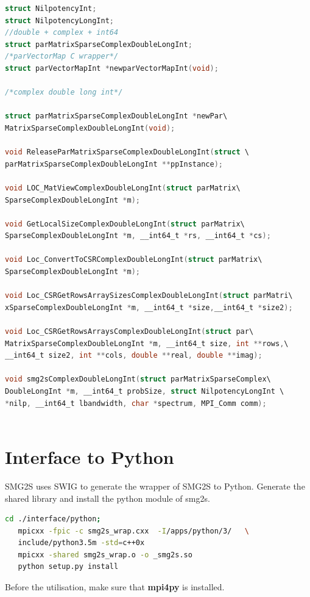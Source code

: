 \documentclass[a4paper, 10 pt]{report}
\begin{document}
	\begin{lstlisting}[language=C,frame=single,	basicstyle=\footnotesize]
struct NilpotencyInt;
struct NilpotencyLongInt;
//double + complex + int64
struct parMatrixSparseComplexDoubleLongInt;   
/*parVectorMap C wrapper*/
struct parVectorMapInt *newparVectorMapInt(void);
   
/*complex double long int*/
   
struct parMatrixSparseComplexDoubleLongInt *newPar\
MatrixSparseComplexDoubleLongInt(void);

void ReleaseParMatrixSparseComplexDoubleLongInt(struct \
parMatrixSparseComplexDoubleLongInt **ppInstance);

void LOC_MatViewComplexDoubleLongInt(struct parMatrix\
SparseComplexDoubleLongInt *m);

void GetLocalSizeComplexDoubleLongInt(struct parMatrix\
SparseComplexDoubleLongInt *m, __int64_t *rs, __int64_t *cs);

void Loc_ConvertToCSRComplexDoubleLongInt(struct parMatrix\
SparseComplexDoubleLongInt *m);
   
void Loc_CSRGetRowsArraySizesComplexDoubleLongInt(struct parMatri\
xSparseComplexDoubleLongInt *m, __int64_t *size,__int64_t *size2);

void Loc_CSRGetRowsArraysComplexDoubleLongInt(struct par\
MatrixSparseComplexDoubleLongInt *m, __int64_t size, int **rows,\
__int64_t size2, int **cols, double **real, double **imag);

void smg2sComplexDoubleLongInt(struct parMatrixSparseComplex\
DoubleLongInt *m, __int64_t probSize, struct NilpotencyLongInt \
*nilp, __int64_t lbandwidth, char *spectrum, MPI_Comm comm);
   
	\end{lstlisting}

	\section{Interface to Python}
	
	SMG2S uses SWIG to generate the wrapper of SMG2S to Python. Generate the shared library and install the python module of smg2s.
	\begin{lstlisting}[language=bash,frame=single]
   cd ./interface/python;
   mpicxx -fpic -c smg2s_wrap.cxx  -I/apps/python/3/   \
   include/python3.5m -std=c++0x
   mpicxx -shared smg2s_wrap.o -o _smg2s.so
   python setup.py install
	\end{lstlisting}
	
	Before the utilisation, make sure that \textbf{mpi4py} is installed.
	
\end{document}
